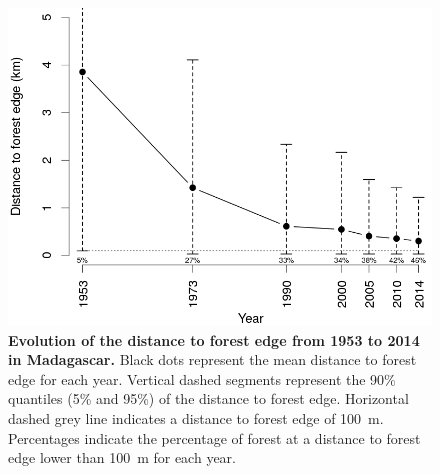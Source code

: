 \documentclass[a4paper, 12pt, leqno]{article} %
\begin{document}
\begin{figure}[h!]
  \centering
  
  \includegraphics[width=13cm]{outputs/dist.png}
  
  \caption{\textbf{Evolution of the distance to forest edge from
      1953 to 2014 in Madagascar.} Black dots represent the mean distance to
    forest edge for each year. Vertical dashed segments represent the 90\%
    quantiles (5\% and 95\%) of the distance to forest edge. Horizontal
    dashed grey line indicates a distance to forest edge of 100~m.
    Percentages indicate the percentage of forest at a distance to forest
    edge lower than 100~m for each year.}

  \label{fig:dist_edge}

\end{figure}
\end{document}
